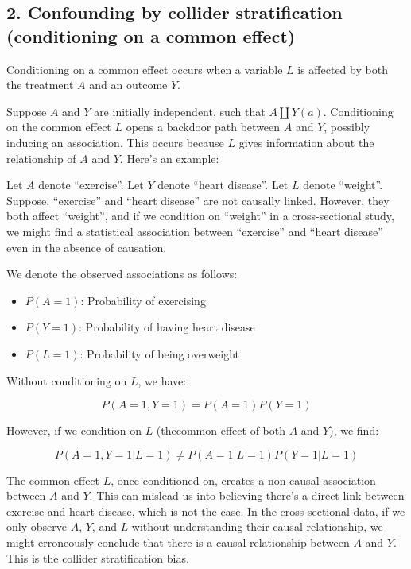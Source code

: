 \documentclass[
  singlecolumn]{report}
\providecommand{\tightlist}{%
  \setlength{\itemsep}{0pt}\setlength{\parskip}{0pt}}\usepackage{longtable,booktabs,array}
\begin{document}
\hypertarget{confounding-by-collider-stratification-conditioning-on-a-common-effect}{%
\subsection{2. Confounding by collider stratification (conditioning on a
common
effect)}\label{confounding-by-collider-stratification-conditioning-on-a-common-effect}}

Conditioning on a common effect occurs when a variable \(L\) is affected
by both the treatment \(A\) and an outcome \(Y\).

Suppose \(A\) and \(Y\) are initially independent, such that
\(A \coprod Y(a)\). Conditioning on the common effect \(L\) opens a
backdoor path between \(A\) and \(Y\), possibly inducing an association.
This occurs because \(L\) gives information about the relationship of
\(A\) and \(Y\). Here's an example:

Let \(A\) denote ``exercise''. Let \(Y\) denote ``heart disease''. Let
\(L\) denote ``weight''. Suppose, ``exercise'' and ``heart disease'' are
not causally linked. However, they both affect ``weight'', and if we
condition on ``weight'' in a cross-sectional study, we might find a
statistical association between ``exercise'' and ``heart disease'' even
in the absence of causation.

We denote the observed associations as follows:

\begin{itemize}
\tightlist
\item
  \(P(A = 1)\): Probability of exercising
\item
  \(P(Y = 1)\): Probability of having heart disease
\item
  \(P(L = 1)\): Probability of being overweight
\end{itemize}

Without conditioning on \(L\), we have:

\[P(A = 1, Y = 1) = P(A = 1)P(Y = 1)\]

However, if we condition on \(L\) (thecommon effect of both \(A\) and
\(Y\)), we find:

\[P(A = 1, Y = 1 | L = 1) \neq P(A = 1 | L = 1)P(Y = 1 | L = 1)\]

The common effect \(L\), once conditioned on, creates a non-causal
association between \(A\) and \(Y\). This can mislead us into believing
there's a direct link between exercise and heart disease, which is not
the case. In the cross-sectional data, if we only observe \(A\), \(Y\),
and \(L\) without understanding their causal relationship, we might
erroneously conclude that there is a causal relationship between \(A\)
and \(Y\). This is the collider stratification bias.
\end{document}
